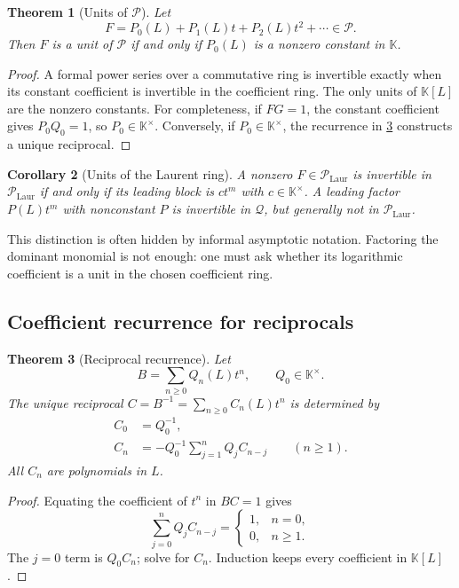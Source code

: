 \documentclass[11pt]{article}
\theoremstyle{pltheorem}
\newtheorem{theorem}{Theorem}[section]
\newtheorem{corollary}[theorem]{Corollary}
\newcommand{\K}{\mathbb K}
\newcommand{\PL}{\mathscr P}
\newcommand{\PLL}{\mathscr P_{\mathrm{Laur}}}
\newcommand{\QPL}{\mathscr Q}
\begin{document}
\begin{theorem}[Units of \(\PL\)]\label{thm:units-P}
Let
\[
 F=P_0(L)+P_1(L)t+P_2(L)t^2+\cdots\in\PL.
\]
Then \(F\) is a unit of \(\PL\) if and only if \(P_0(L)\) is a nonzero constant in \(\K\).
\end{theorem}

\begin{proof}
A formal power series over a commutative ring is invertible exactly when its constant coefficient is invertible in the coefficient ring.  The only units of \(\K[L]\) are the nonzero constants.  For completeness, if \(FG=1\), the constant coefficient gives \(P_0Q_0=1\), so \(P_0\in\K^\times\).  Conversely, if \(P_0\in\K^\times\), the recurrence in \cref{thm:reciprocal-recurrence} constructs a unique reciprocal.
\end{proof}

\begin{corollary}[Units of the Laurent ring]\label{cor:units-Laurent}
A nonzero \(F\in\PLL\) is invertible in \(\PLL\) if and only if its leading block is
\(ct^m\) with \(c\in\K^\times\).  A leading factor \(P(L)t^m\) with nonconstant \(P\) is invertible in \(\QPL\), but generally not in \(\PLL\).
\end{corollary}

This distinction is often hidden by informal asymptotic notation.  Factoring the dominant monomial is not enough: one must ask whether its logarithmic coefficient is a unit in the chosen coefficient ring.

\subsection{Coefficient recurrence for reciprocals}

\begin{theorem}[Reciprocal recurrence]\label{thm:reciprocal-recurrence}
Let
\begin{equation}\label{eq:B-and-C}
 B=\sum_{n\ge0}Q_n(L)t^n,
 \qquad Q_0\in\K^\times.
\end{equation}
The unique reciprocal
\(C=B^{-1}=\sum_{n\ge0}C_n(L)t^n\) is determined by
\begin{align}
 C_0&=Q_0^{-1},\label{eq:reciprocal-C0}\\
 C_n&=-Q_0^{-1}\sum_{j=1}^{n}Q_jC_{n-j}
 \qquad(n\ge1).\label{eq:reciprocal-Cn}
\end{align}
All \(C_n\) are polynomials in \(L\).
\end{theorem}

\begin{proof}
Equating the coefficient of \(t^n\) in \(BC=1\) gives
\[
 \sum_{j=0}^{n}Q_jC_{n-j}=\begin{cases}1,&n=0,\\0,&n\ge1.\end{cases}
\]
The \(j=0\) term is \(Q_0C_n\); solve for \(C_n\).  Induction keeps every coefficient in \(\K[L]\).
\end{proof}
\end{document}
